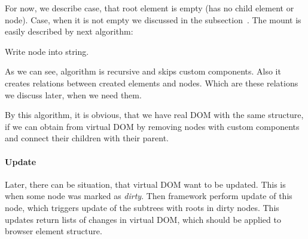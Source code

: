 \documentclass[oneside, 12pt]{book}
\begin{document}
        For now, we describe case, that root element is empty (has no child element or node).
        Case, when it is not empty we discussed in the subsection~.
        The mount is easily described by next algorithm:
        \begin{algorithm}[H]
          \caption{Write node into string.}
        \end{algorithm}

        As we can see, algorithm is recursive and skips custom components. 
        Also it creates relations between created elements and nodes. 
        Which are these relations we discuss later, when we need them.

        By this algorithm, it is obvious, that we have real DOM with the same structure, 
        if we can obtain from virtual DOM by removing nodes with custom components 
        and connect their children with their parent.

      \paragraph{Update}\label{par:our-architecture-rendering-browser-update} 
        Later, there can be situation, that virtual DOM want to be updated. 
        This is when some node was marked as \textit{dirty}.
        Then framework perform update of this node, 
        which triggers update of the subtrees with roots in dirty nodes.
        This updates return lists of changes in virtual DOM, 
        which should be applied to browser element structure.
\end{document}
